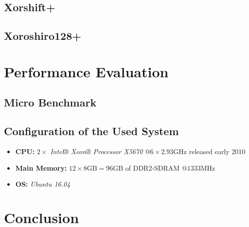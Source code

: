 	

\subsection[Xorshift+]{Xorshift+} \label{subsec:xorshift+}

	

\subsection[Xoroshiro128+]{Xoroshiro128+} \label{subsec:xoroshiro128+}

	

\section[Performance Evaluation]{Performance Evaluation} \label{sec:random-performance}

\subsection[Micro Benchmark]{Micro Benchmark}

	

\subsection[System Configuration]{Configuration of the Used System}

\begin{@empty}
	\begin{itemize}
		\itemsep0em
		\item	\textbf{CPU:} $2 \times $ \emph{Intel® Xeon® Processor X5670} @$6 \times 2.93\text{GHz}$ released early 2010
		\item	\textbf{Main Memory:} $12 \times 8\text{GB} = 96\text{GB}$ of DDR2-SDRAM @$1333\text{MHz}$
		\item	\textbf{OS:} \emph{Ubuntu 16.04}
	\end{itemize}
\end{@empty}

\section{Conclusion}

